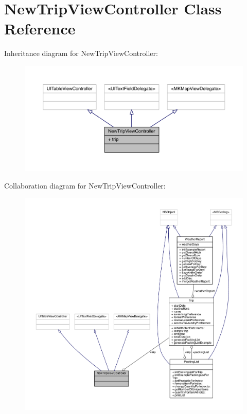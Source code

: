 \hypertarget{interface_new_trip_view_controller}{\section{New\-Trip\-View\-Controller Class Reference}
\label{interface_new_trip_view_controller}
}


Inheritance diagram for New\-Trip\-View\-Controller\-:\nopagebreak
\begin{figure}[H]
\begin{center}
\leavevmode
\includegraphics[width=350pt]{interface_new_trip_view_controller__inherit__graph}
\end{center}
\end{figure}


Collaboration diagram for New\-Trip\-View\-Controller\-:
\nopagebreak
\begin{figure}[H]
\begin{center}
\leavevmode
\includegraphics[width=350pt]{interface_new_trip_view_controller__coll__graph}
\end{center}
\end{figure}
